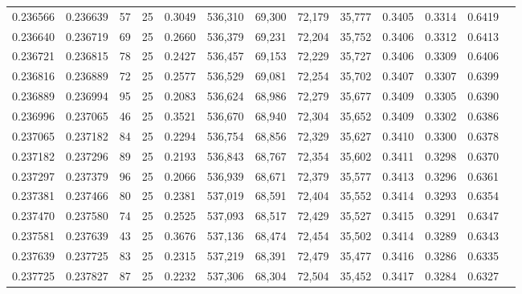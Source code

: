 \begin{tabular}{rrrrrrrrrrrrr}
0.236566 & 0.236639 &    57 &  25 &                                     0.3049 & 536,310 &  69,300 &  72,179 &  35,777 & 0.3405 & 0.3314 & 0.6419 \\
0.236640 & 0.236719 &    69 &  25 &                                     0.2660 & 536,379 &  69,231 &  72,204 &  35,752 & 0.3406 & 0.3312 & 0.6413 \\
0.236721 & 0.236815 &    78 &  25 &                                     0.2427 & 536,457 &  69,153 &  72,229 &  35,727 & 0.3406 & 0.3309 & 0.6406 \\
0.236816 & 0.236889 &    72 &  25 &                                     0.2577 & 536,529 &  69,081 &  72,254 &  35,702 & 0.3407 & 0.3307 & 0.6399 \\
0.236889 & 0.236994 &    95 &  25 &                                     0.2083 & 536,624 &  68,986 &  72,279 &  35,677 & 0.3409 & 0.3305 & 0.6390 \\
0.236996 & 0.237065 &    46 &  25 &                                     0.3521 & 536,670 &  68,940 &  72,304 &  35,652 & 0.3409 & 0.3302 & 0.6386 \\
0.237065 & 0.237182 &    84 &  25 &                                     0.2294 & 536,754 &  68,856 &  72,329 &  35,627 & 0.3410 & 0.3300 & 0.6378 \\
0.237182 & 0.237296 &    89 &  25 &                                     0.2193 & 536,843 &  68,767 &  72,354 &  35,602 & 0.3411 & 0.3298 & 0.6370 \\
0.237297 & 0.237379 &    96 &  25 &                                     0.2066 & 536,939 &  68,671 &  72,379 &  35,577 & 0.3413 & 0.3296 & 0.6361 \\
0.237381 & 0.237466 &    80 &  25 &                                     0.2381 & 537,019 &  68,591 &  72,404 &  35,552 & 0.3414 & 0.3293 & 0.6354 \\
0.237470 & 0.237580 &    74 &  25 &                                     0.2525 & 537,093 &  68,517 &  72,429 &  35,527 & 0.3415 & 0.3291 & 0.6347 \\
0.237581 & 0.237639 &    43 &  25 &                                     0.3676 & 537,136 &  68,474 &  72,454 &  35,502 & 0.3414 & 0.3289 & 0.6343 \\
0.237639 & 0.237725 &    83 &  25 &                                     0.2315 & 537,219 &  68,391 &  72,479 &  35,477 & 0.3416 & 0.3286 & 0.6335 \\
0.237725 & 0.237827 &    87 &  25 &                                     0.2232 & 537,306 &  68,304 &  72,504 &  35,452 & 0.3417 & 0.3284 & 0.6327 \\

\end{tabular}
